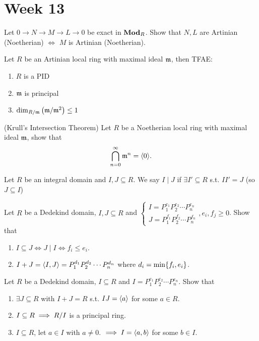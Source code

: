 
\section{Week 13}

\begin{exercise}
  Let $0 \to N \to M \to L \to 0$ be exact in $\mathbf{Mod}_R$.
  Show that $N, L$ are Artinian (Noetherian) $\iff$ $M$ is Artinian (Noetherian).
\end{exercise}

\begin{exercise}
  Let $R$ be an Artinian local ring with maximal ideal $\mathfrak{m}$, 
  then TFAE:
  \begin{enumerate}
    \item $R$ is a PID
    \item $\mathfrak{m}$ is principal
    \item $\dim_{R/\mathfrak{m}} \left( \mathfrak{m}/\mathfrak{m}^2 \right) \leq 1$
  \end{enumerate}
\end{exercise}

\begin{exercise}{(Krull's Intersection Theorem)}
  Let $R$ be a Noetherian local ring with maximal ideal $\mathfrak{m}$, show that
  \[ \bigcap\limits_{n=0}^{\infty} \mathfrak{m}^n = \langle0\rangle. \]
\end{exercise}

\begin{definition}
  Let $R$ be an integral domain and $I, J \subseteq R$.
  We say $I \mid J$ if $\exists I' \subseteq R$ s.t. $II' = J$ (so $J \subseteq I$)
\end{definition}

\begin{exercise}
  Let $R$ be a Dedekind domain, $I, J \subseteq R$ and
  $\begin{cases}
    I = P_1^{e_1}P_2^{e_2} \dotsm P_n^{e_n} \\
    J = P_1^{f_1}P_2^{f_2} \dotsm P_n^{f_n}
  \end{cases}, e_i, f_j \ge 0$.
  Show that
  \begin{enumerate}
    \item $I \subseteq J \iff J \mid I \iff f_i \le e_i$.
    \item $I + J = \langle I, J\rangle = P_1^{d_1}P_2^{d_2} \dotsm P_n^{d_n}$ where
      $d_i = \min\lbrace f_i, e_i\rbrace$.
  \end{enumerate}
\end{exercise}

\begin{exercise}
  Let $R$ be a Dedekind domain, $I \subseteq R$ and $I = P_1^{e_1}P_2^{e_2} \dotsm P_n^{e_n}$.
  Show that
  \begin{enumerate}
    \item $\exists J \subseteq R$ with $I+J = R$ s.t. $IJ=\langle a\rangle$ for some
      $a \in R$.
    \item $I \subseteq R \implies {R}/{I}$ is a principal ring.
    \item $I \subseteq R$, let $a \in I$ with $a \ne 0$. $\implies I = \langle a, b\rangle$
      for some $b\in I$.
  \end{enumerate}
\end{exercise}
